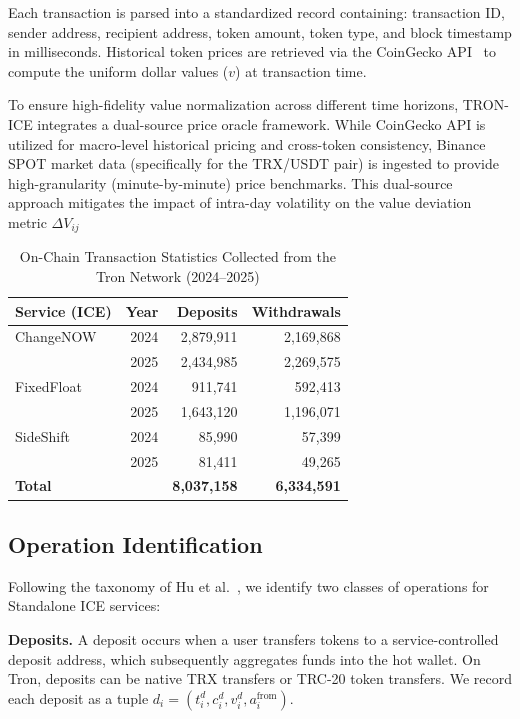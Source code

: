 \documentclass[journal]{IEEEtran}
\begin{document}
    Each transaction is parsed into a standardized record containing: transaction ID, sender address, recipient address, token amount, token type, and block timestamp in milliseconds. Historical token prices are retrieved via the CoinGecko API~\cite{coingecko2024} to compute the uniform dollar values ($v$) at transaction time.
    
    To ensure high-fidelity value normalization across different time horizons, TRON-ICE integrates a dual-source price oracle framework. While CoinGecko API is utilized for macro-level historical pricing and cross-token consistency, Binance SPOT market data (specifically for the TRX/USDT pair) is ingested to provide high-granularity (minute-by-minute) price benchmarks. This dual-source approach mitigates the impact of intra-day volatility on the value deviation metric $\Delta V_{ij}$
    
    
    \begin{table}[t]
    \centering
    \caption{On-Chain Transaction Statistics Collected from the Tron Network (2024--2025)}
    \label{tab:statistics}
    \begin{tabular}{lrrr}
    \toprule
    \textbf{Service (ICE)} & \textbf{Year} & \textbf{Deposits} & \textbf{Withdrawals} \\
    \midrule
    ChangeNOW & 2024 & 2,879,911 & 2,169,868 \\
              & 2025 & 2,434,985 & 2,269,575 \\
    \midrule
    FixedFloat & 2024 & 911,741   & 592,413 \\
               & 2025 & 1,643,120 & 1,196,071 \\
    \midrule
    SideShift  & 2024 & 85,990    & 57,399 \\
               & 2025 & 81,411    & 49,265 \\
    \midrule
    \textbf{Total} &   & \textbf{8,037,158} & \textbf{6,334,591} \\
    \bottomrule
    \end{tabular}
    \end{table}
    
    
    \subsection{Operation Identification}
    Following the taxonomy of Hu et al.~\cite{hu2024ice}, we identify two classes of operations for Standalone ICE services:
    
    \textbf{Deposits.} A deposit occurs when a user transfers tokens to a service-controlled deposit address, which subsequently aggregates funds into the hot wallet. On Tron, deposits can be native TRX transfers or TRC-20 token transfers. We record each deposit as a tuple $d_i=(t_i^d, c_i^d, v_i^d, a_i^{\text{from}})$.
    
\end{document}

